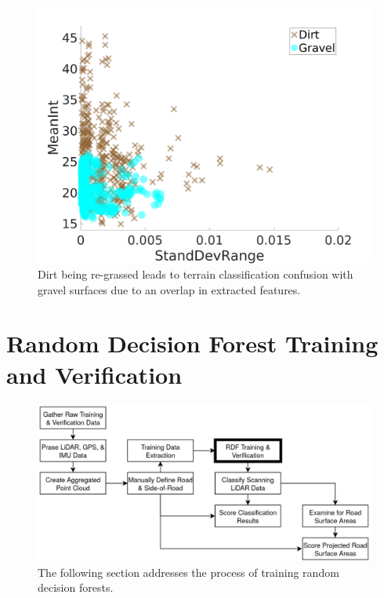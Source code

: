 \documentclass[numbered,pdftex]{ohio-etd}
\begin{document}
{{		\begin{figure}[H]
			\centering
			\includegraphics[width=0.65\linewidth]{Defense_Images/dirt_v_gravel2}
			\caption[Dirt vs Gravel]{Dirt being re-grassed leads to terrain classification confusion with gravel surfaces due to an overlap in extracted features. }
			\label{fig:dirt_v_gravel2}
		\end{figure}
		
	} %
		
	
	\section{Random Decision Forest Training and Verification}\label{sec:rdf_train_verify}{
		
		\begin{figure}[H]
			\centering
			\includegraphics[width=0.9\linewidth]{Defense_Images/flowz_rdf_train}
			\caption[RDF Training Flowchart Context]{The following section addresses the process of training random decision forests.}
			\label{fig:flowz_rdf_train}
		\end{figure}
		
}}
\end{document}
